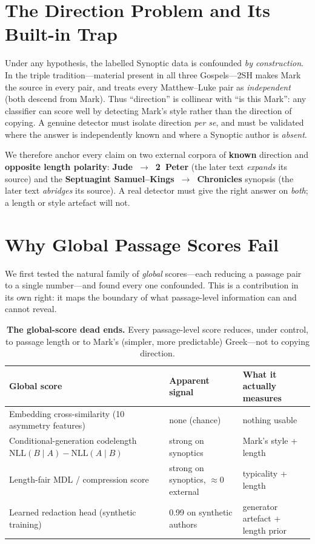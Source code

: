 \documentclass[11pt,letterpaper]{article}
\newcommand{\tblhead}{\rowcolor{marine!12}}
\begin{document}
\section{The Direction Problem and Its Built-in Trap}
\label{sec:trap}

Under any hypothesis, the labelled Synoptic data is confounded \textit{by construction}. In the
triple tradition---material present in all three Gospels---2SH makes Mark the source in every
pair, and treats every Matthew--Luke pair as \textit{independent} (both descend from Mark). Thus
``direction'' is collinear with ``is this Mark'': any classifier can score well by detecting
Mark's style rather than the direction of copying. A genuine detector must isolate direction
\textit{per se}, and must be validated where the answer is independently known and where a
Synoptic author is \textit{absent}.

We therefore anchor every claim on two external corpora of \textbf{known} direction and
\textbf{opposite length polarity}: \textbf{Jude~$\rightarrow$~2~Peter} (the later text
\textit{expands} its source) and the \textbf{Septuagint Samuel--Kings~$\rightarrow$~Chronicles}
synopsis (the later text \textit{abridges} its source). A real detector must give the right
answer on \textit{both}; a length or style artefact will not.

\section{Why Global Passage Scores Fail}
\label{sec:negatives}

We first tested the natural family of \textit{global} scores---each reducing a passage pair to a
single number---and found every one confounded. This is a contribution in its own right: it maps
the boundary of what passage-level information can and cannot reveal.

\begin{table}[H]
\centering
\small
\begin{tabular}{L{4.6cm}L{4.4cm}L{4.9cm}}
\toprule
\tblhead\textbf{Global score} & \textbf{Apparent signal} & \textbf{What it actually measures} \\
\midrule
Embedding cross-similarity (10 asymmetry features) & none (chance) & nothing usable \\
Conditional-generation codelength $\mathrm{NLL}(B\!\mid\!A)-\mathrm{NLL}(A\!\mid\!B)$ & strong on synoptics & Mark's style + length \\
Length-fair MDL / compression score & strong on synoptics, $\approx 0$ external & typicality + length \\
Learned redaction head (synthetic training) & 0.99 on synthetic authors & generator artefact + length prior \\
\bottomrule
\end{tabular}
\caption{\textbf{The global-score dead ends.} Every passage-level score reduces, under control,
to passage length or to Mark's (simpler, more predictable) Greek---not to copying direction.}
\label{tab:negatives}
\end{table}
\end{document}
